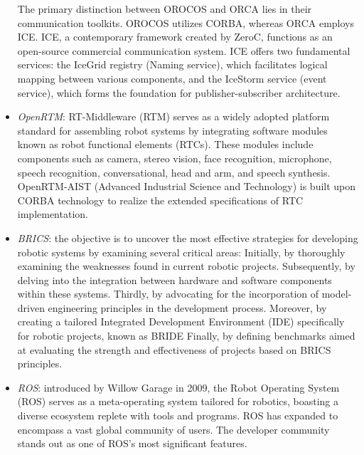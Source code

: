 \begin{itemize}
        The primary distinction between OROCOS and ORCA lies in their communication toolkits. 
        OROCOS utilizes CORBA, whereas ORCA employs ICE.\@
        ICE, a contemporary framework created by ZeroC, functions as an open-source commercial communication system. 
        ICE offers two fundamental services: the IceGrid registry (Naming service), which facilitates logical mapping between various components, and the IceStorm service (event service), which forms the foundation for publisher-subscriber architecture.
    \item \textit{OpenRTM}: RT-Middleware (RTM) serves as a widely adopted platform standard for assembling robot systems by integrating software modules known as robot functional elements (RTCs). 
        These modules include components such as camera, stereo vision, face recognition, microphone, speech recognition, conversational, head and arm, and speech synthesis. 
        OpenRTM-AIST (Advanced Industrial Science and Technology) is built upon CORBA technology to realize the extended specifications of RTC implementation.
    \item \textit{BRICS}: the objective is to uncover the most effective strategies for developing robotic systems by examining several critical areas:
        Initially, by thoroughly examining the weaknesses found in current robotic projects.    
        Subsequently, by delving into the integration between hardware and software components within these systems.    
        Thirdly, by advocating for the incorporation of model-driven engineering principles in the development process.    
        Moreover, by creating a tailored Integrated Development Environment (IDE) specifically for robotic projects, known as BRIDE\@    
        Finally, by defining benchmarks aimed at evaluating the strength and effectiveness of projects based on BRICS principles.
    \item \textit{ROS}: introduced by Willow Garage in 2009, the Robot Operating System (ROS) serves as a meta-operating system tailored for robotics, boasting a diverse ecosystem replete with tools and programs.
        ROS has expanded to encompass a vast global community of users. 
        The developer community stands out as one of ROS's most significant features.
\end{itemize}  